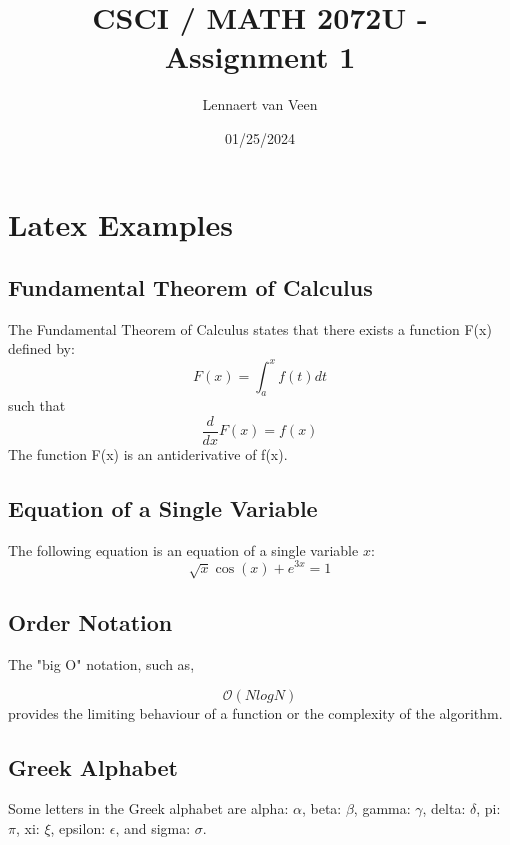 \documentclass{article}
\title{CSCI / MATH 2072U - Assignment 1}
\author{ Lennaert van Veen }         %
\date{ 01/25/2024 }           %
\begin{document}
\maketitle

\section{Latex Examples}

\subsection{Fundamental Theorem of Calculus}
 
The Fundamental Theorem of Calculus states that there exists a function F(x) defined by:
$$
F(x)=\int_{a}^{x} f(t)dt
$$
such that
$$
\frac{d}{dx}F(x)=f(x)
$$
The function F(x) is an antiderivative of f(x).

\subsection{Equation of a Single Variable}
  
The following equation is an equation of a single variable $x$:
$$
\sqrt{x}\cos(x)+e^{3x}=1
$$  

\subsection{Order Notation}
 
The "big O" notation, such as,

$$
\mathcal{O}(NlogN)
$$  
provides the limiting behaviour of a function or the complexity of the algorithm.

\subsection{Greek Alphabet}
 
Some letters in the Greek alphabet are alpha: $\alpha$, beta: $\beta$, gamma: $\gamma$, delta: $\delta$, pi: $\pi$, xi: $\xi$, epsilon: $\epsilon$, and sigma: $\sigma$.
\end{document}
